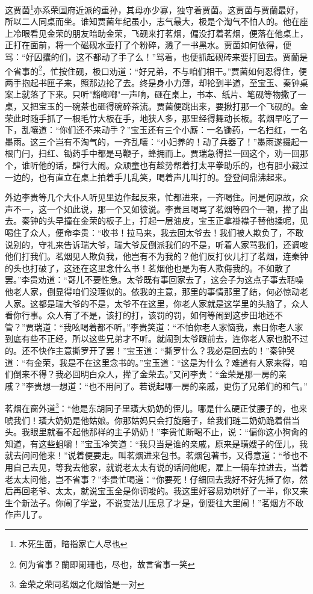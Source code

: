 \documentclass[12pt,oneside]{book}
\begin{document}
这贾菌\footnote{木死生菌，暗指家亡人尽也}亦系荣国府近派的重孙，其母亦少寡，独守着贾菌。这贾菌与贾蘭最好，所以二人同桌而坐。谁知贾菌年纪虽小，志气最大，极是个淘气不怕人的。他在座上冷眼看见金荣的朋友暗助金荣，飞砚来打茗烟，偏没打着茗烟，便落在他桌上，正打在面前，将一个磁砚水壶打了个粉碎，溅了一书黑水。贾菌如何依得，便骂：“好囚攮的们，这不都动了手了么！”骂着，也便抓起砚砖来要打回去。贾蘭是个省事的\footnote{何为省事？蘭即阑珊也，尽也，故言省事一笑}，忙按住砚，极口劝道：“好兄弟，不与咱们相干。”贾菌如何忍得住，便两手抱起书匣子来，照那边抡了去。终是身小力薄，却抡到半道，至宝玉、秦钟桌案上就落了下来。只听"豁啷啷"一声响，砸在桌上，书本、纸片、笔砚等物撒了一桌，又把宝玉的一碗茶也砸得碗碎茶流。贾菌便跳出来，要揪打那一个飞砚的。金荣此时随手抓了一根毛竹大板在手，地狭人多，那里经得舞动长板。茗烟早吃了一下，乱嚷道：“你们还不来动手？”宝玉还有三个小厮：一名锄药，一名扫红，一名墨雨。这三个岂有不淘气的，一齐乱嚷：“小妇养的！动了兵器了！”墨雨遂掇起一根门闩，扫红、锄药手中都是马鞭子，蜂拥而上。贾瑞急得拦一回这个，劝一回那个，谁听他的话，肆行大闹。众顽童也有趁势帮着打太平拳助乐的，也有胆小藏过一边的，也有直立在桌上拍着手儿乱笑，喝着声儿叫打的。登登间鼎沸起来。

外边李贵等几个大仆人听见里边作起反来，忙都进来，一齐喝住。问是何原故，众声不一，这一个如此说，那一个又如彼说。李贵且喝骂了茗烟等四个一顿，撵了出去。秦钟的头早撞在金荣的板子上，打起一层油皮，宝玉正拿褂襟子替他揉呢，见喝住了众人，便命李贵：“收书！拉马来，我去回太爷去！我们被人欺负了，不敢说别的，守礼来告诉瑞大爷，瑞大爷反倒派我们的不是，听着人家骂我们，还调唆他们打我们。茗烟见人欺负我，他岂有不为我的？他们反打伙儿打了茗烟，连秦钟的头也打破了，这还在这里念什么书！茗烟他也是为有人欺侮我的。不如散了罢。”李贵劝道：“哥儿不要性急。太爷既有事回家去了，这会子为这点子事去聒噪他老人家，倒显得咱们没理似的。依我的主意，那里的事情那里了结，何必惊动老人家。这都是瑞大爷的不是，太爷不在这里，你老人家就是这学里的头脑了，众人看你行事。众人有了不是，该打的打，该罚的罚，如何等闹到这步田地还不管？”贾瑞道：“我吆喝着都不听。”李贵笑道：“不怕你老人家恼我，素日你老人家到底有些不正经，所以这些兄弟才不听。就闹到太爷跟前去，连你老人家也脱不过的。还不快作主意撕罗开了罢！”宝玉道：“撕罗什么？我必是回去的！”秦钟哭道：“有金荣，我是不在这里念书的。”宝玉道：“这是为什么？难道有人家来得，咱们倒来不得？我必回明白众人，撵了金荣去。”又问李贵：“金荣是那一房的亲戚？”李贵想一想道：“也不用问了。若说起哪一房的亲戚，更伤了兄弟们的和气。”

茗烟在窗外道\footnote{金荣之荣同茗烟之化烟恰是一对}：“他是东胡同子里璜大奶奶的侄儿。哪是什么硬正仗腰子的，也来唬我们！璜大奶奶是他姑娘。你那姑妈只会打旋磨子，给我们琏二奶奶跪着借当头。我眼里就看不起他那样的主子奶奶！”李贵忙断喝不止，说：“偏你这小狗肏的知道，有这些蛆嚼！”宝玉冷笑道：“我只当是谁的亲戚，原来是璜嫂子的侄儿，我就去问问他来！”说着便要走。叫茗烟进来包书。茗烟包著书，又得意道：“爷也不用自己去见，等我去他家，就说老太太有说的话问他呢，雇上一辆车拉进去，当着老太太问他，岂不省事？”李贵忙喝道：“你要死！仔细回去我好不好先捶了你，然后再回老爷、太太，就说宝玉全是你调唆的。我这里好容易劝哄好了一半，你又来生个新法子。你闹了学堂，不说变法儿压息了才是，倒要往大里闹！”茗烟方不敢作声儿了。
\end{document}
